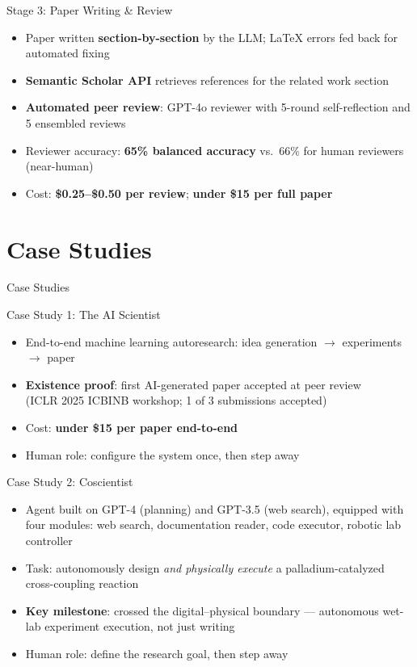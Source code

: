 \documentclass[aspectratio=169]{beamer}
\begin{document}
\begin{frame}{Stage 3: Paper Writing \& Review}
  \begin{itemize}
    \item Paper written \textbf{section-by-section} by the LLM; LaTeX errors fed back for automated fixing
    \item \textbf{Semantic Scholar API} retrieves references for the related work section
    \item \textbf{Automated peer review}: GPT-4o reviewer with 5-round self-reflection and 5 ensembled reviews
    \item Reviewer accuracy: \textbf{65\% balanced accuracy} vs.\ 66\% for human reviewers (near-human) \citep{lu2024aiscientist}
    \item Cost: \textbf{\$0.25--\$0.50 per review}; \textbf{under \$15 per full paper}
  \end{itemize}
\end{frame}

\section{Case Studies}

\begin{frame}{}
  \centering
  \Large Case Studies
\end{frame}

\begin{frame}{Case Study 1: The AI Scientist}
  \begin{itemize}
    \item End-to-end machine learning autoresearch: idea generation $\to$ experiments $\to$ paper \citep{lu2024aiscientist}
    \item \textbf{Existence proof}: first AI-generated paper accepted at peer review\\
          (ICLR 2025 ICBINB workshop; 1 of 3 submissions accepted) \citep{yamada2025aiscientistv2}
    \item Cost: \textbf{under \$15 per paper end-to-end}
    \item Human role: configure the system once, then step away
  \end{itemize}
\end{frame}

\begin{frame}{Case Study 2: Coscientist}
  \begin{itemize}
    \item Agent built on GPT-4 (planning) and GPT-3.5 (web search), equipped with four modules: web search, documentation reader, code executor, robotic lab controller \citep{boiko2023coscientist}
    \item Task: autonomously design \textit{and physically execute} a palladium-catalyzed cross-coupling reaction
    \item \textbf{Key milestone}: crossed the digital--physical boundary --- autonomous wet-lab experiment execution, not just writing
    \item Human role: define the research goal, then step away
  \end{itemize}
\end{frame}
\end{document}
